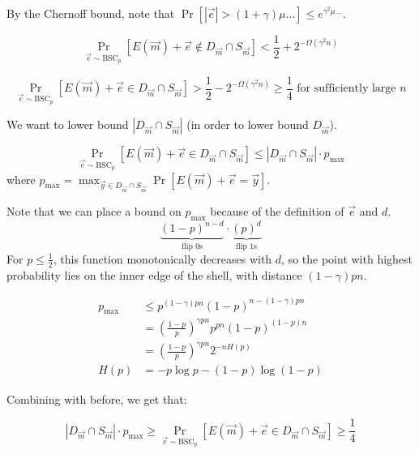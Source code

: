 \documentclass{idc_msc}
\begin{document}
\begin{enumerate}
\begin{itemize}
    By the Chernoff bound, note that \(\Pr[|\vec{e}| > (1 + \gamma)\mu\ldots] \le e^{\gamma^2\mu\ldots}\).

    \[\Pr_{\vec{e} \sim \text{BSC}_p} [E(\vec{m}) + \vec{e} \notin D_{\vec{m}} \cap S_{\vec{m}}] < \frac{1}{2} + 2^{-\Omega(\gamma^2n)}  \]
    
    \[\Pr_{\vec{e} \sim \text{BSC}_p} [E(\vec{m}) + \vec{e} \in D_{\vec{m}} \cap S_{\vec{m}}] > \frac{1}{2} - 2^{-\Omega(\gamma^2n)} \ge \frac{1}{4} \text{ for sufficiently large \(n\)}\]

    We want to lower bound \(|D_{\vec{m}} \cap S_{\vec{m}}|\) (in order to lower bound \(D_{\vec{m}}\)).

    \[\Pr_{\vec{e} \sim \text{BSC}_p} [ E(\vec{m}) + \vec{e} \in D_{\vec{m}} \cap S_{\vec{m}} ] \le | {D_{\vec{m}} \cap S_{\vec{m}}} | \cdot p_{\max}\]
    where \(p_{\max} = \max_{\vec{y} \in D_{\vec{m}} \cap S_{\vec{m}}} \Pr[E(\vec{m})+\vec{e} = \vec{y}]\).

    Note that we can place a bound on \(p_{\max}\) because of the definition of \(\vec{e}\) and \(d\).
    \[\underbrace{(1-p)^{n-d}}_{\text{flip 0s}} \cdot \underbrace{(p)^d}_{\text{flip 1s}}\]
    For \(p \le \frac{1}{2}\), this function monotonically decreases with \(d\), so the point with highest probability lies on the inner edge of the shell, with distance \((1 - \gamma)pn\).

    \[
    \begin{aligned}
    p_{\max}
    & \le p^{(1-\gamma)pn} (1-p)^{n - (1-\gamma)pn} \\
    & = \left(\frac{1-p}{p}\right)^{\gamma pn} p^{pn} (1-p)^{(1-p)n} \\
    & = \left(\frac{1-p}{p}\right)^{\gamma pn} 2^{-nH(p)} \\
    H(p) &= -p\log p - (1-p)\log(1-p)
    \end{aligned}
    \]

    Combining with before, we get that:

    \[|D_{\vec{m}} \cap S_{\vec{m}}| \cdot p_{\max} \ge \Pr_{\vec{e} \sim \text{BSC}_p} [ E(\vec{m}) + \vec{e} \in D_{\vec{m}} \cap S_{\vec{m}} ] \ge \frac{1}{4}\]


\end{itemize}
\end{enumerate}
\end{document}
